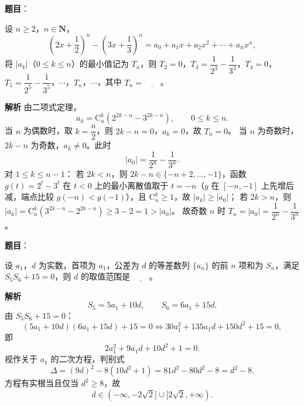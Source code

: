 \begin{answer}

\textbf{题目}：

设 $n\geqslant 2$，$n\in\mathbf N$，
\nopagebreak[4]
\[\left(2x+\frac12\right)^n-\left(3x+\frac13\right)^n=a_0+a_1x+a_2x^2+\cdots+a_nx^n,\]
将 $|a_k|$（$0\leqslant k\leqslant n$）的最小值记为 $T_n$，则 $T_2=0$，$T_3=\dfrac1{2^3}-\dfrac1{3^3}$，$T_4=0$，$T_5=\dfrac1{2^5}-\dfrac1{3^5}$，$\cdots$，$T_n$，$\cdots$，其中 $T_n=\underline{\qquad}$。

\textbf{解析}
由二项式定理，
\nopagebreak[4]
\[a_k=\mathrm C_n^k\left(2^{2k-n}-3^{2k-n}\right),\qquad 0\leqslant k\leqslant n.\]
当 $n$ 为偶数时，取 $k=\dfrac n2$，则 $2k-n=0$，$a_k=0$，故 $T_n=0$。
当 $n$ 为奇数时，$2k-n$ 为奇数，$a_k\neq0$。此时
\nopagebreak[4]
\[|a_0|=\frac1{2^n}-\frac1{3^n}.\]
对 $1\leqslant k\leqslant n-1$：
若 $2k<n$，则 $2k-n\in\{-n+2,\dots,-1\}$，函数 $g(t)=2^t-3^t$ 在 $t<0$ 上的最小离散值取于 $t=-n$（$g$ 在 $[-n,-1]$ 上先增后减，端点比较 $g(-n)<g(-1)$），且 $\mathrm C_n^k\geqslant1$，故 $|a_k|\geqslant|a_0|$；
若 $2k>n$，则 $|a_k|=\mathrm C_n^k\left(3^{2k-n}-2^{2k-n}\right)\geqslant3-2=1>|a_0|$。
故奇数 $n$ 时 $T_n=|a_0|=\dfrac1{2^n}-\dfrac1{3^n}$。


\end{answer}
\begin{answer}

\textbf{题目}：

设 $a_1$，$d$ 为实数，首项为 $a_1$，公差为 $d$ 的等差数列 $\{a_n\}$ 的前 $n$ 项和为 $S_n$，满足 $S_5S_6+15=0$，则 $d$ 的取值范围是 $\underline{\qquad}$。

\textbf{解析}
\nopagebreak[4]
\[S_5=5a_1+10d,\qquad S_6=6a_1+15d.\]
由 $S_5S_6+15=0$：
\nopagebreak[4]
\[(5a_1+10d)(6a_1+15d)+15=0
\iff 30a_1^2+135a_1d+150d^2+15=0,\]
即
\nopagebreak[4]
\[2a_1^2+9a_1d+10d^2+1=0.\]
视作关于 $a_1$ 的二次方程，判别式
\nopagebreak[4]
\[\Delta=(9d)^2-8(10d^2+1)=81d^2-80d^2-8=d^2-8.\]
方程有实根当且仅当 $d^2\geqslant8$，故
\nopagebreak[4]
\[d\in(-\infty,-2\sqrt2]\cup[2\sqrt2,+\infty).\]

\gkanswer{答案：$(-\infty,-2\sqrt2]\cup[2\sqrt2,+\infty)$。}

\end{answer}
